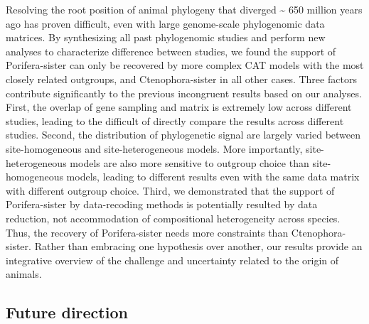 \documentclass[]{article}
\begin{document}
Resolving the root position of animal phylogeny that diverged
\textasciitilde{} 650 million years ago has proven difficult, even with
large genome-scale phylogenomic data matrices. By synthesizing all past
phylogenomic studies and perform new analyses to characterize difference
between studies, we found the support of Porifera-sister can only be
recovered by more complex CAT models with the most closely related
outgroups, and Ctenophora-sister in all other cases. Three factors
contribute significantly to the previous incongruent results based on
our analyses. First, the overlap of gene sampling and matrix is
extremely low across different studies, leading to the difficult of
directly compare the results across different studies. Second, the
distribution of phylogenetic signal are largely varied between
site-homogeneous and site-heterogeneous models. More importantly,
site-heterogeneous models are also more sensitive to outgroup choice
than site-homogeneous models, leading to different results even with the
same data matrix with different outgroup choice. Third, we demonstrated
that the support of Porifera-sister by data-recoding methods is
potentially resulted by data reduction, not accommodation of
compositional heterogeneity across species. Thus, the recovery of
Porifera-sister needs more constraints than Ctenophora-sister. Rather
than embracing one hypothesis over another, our results provide an
integrative overview of the challenge and uncertainty related to the
origin of animals.

\hypertarget{future-direction}{%
\subsection{Future direction}\label{future-direction}}
\end{document}
